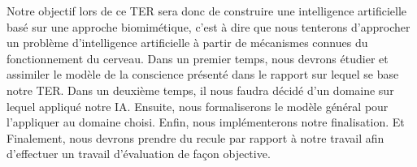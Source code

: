 Notre objectif lors de ce TER sera donc de construire une intelligence artificielle basé sur une approche biomimétique, c'est à dire que nous tenterons d'approcher un problème d'intelligence artificielle à partir de mécanismes connues du fonctionnement du cerveau. Dans un premier temps, nous devrons étudier et assimiler le modèle de la conscience présenté dans le rapport sur lequel se base notre TER. Dans un deuxième temps, il nous faudra décidé d'un domaine sur lequel appliqué notre IA. Ensuite, nous formaliserons le modèle général pour l'appliquer au domaine choisi. Enfin, nous implémenterons notre finalisation. Et Finalement, nous devrons prendre du recule par rapport à notre travail afin d'effectuer un travail d'évaluation de façon objective.